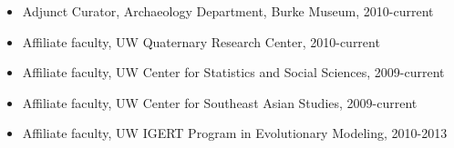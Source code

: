 \begin{itemize}[noitemsep, font=$\bullet$\scshape\bfseries]
\item Adjunct Curator, Archaeology Department, Burke Museum, 2010-current

\item Affiliate faculty, UW Quaternary Research Center, 2010-current

\item  Affiliate faculty, UW Center for Statistics and Social Sciences, 2009-current

\item  Affiliate faculty, UW Center for Southeast Asian Studies, 2009-current

\item  Affiliate faculty, UW IGERT Program in Evolutionary Modeling, 2010-2013

\end{itemize}

\medskip

